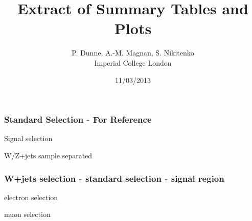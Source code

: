 \documentclass[red,compress,xcolor=table]{beamer}
\title%
{Extract of Summary Tables and Plots}
\subtitle
{} %
\author[A.-M. Magnan] %
{P. Dunne, A.-M. Magnan, S. Nikitenko\\
  Imperial College London}
\date[11/03/2013] %
{11/03/2013}
\begin{document}
\begin{frame}
  \titlepage
\end{frame}

\begin{frame}
  \frametitle{Standard Selection - For Reference}

\begin{center}
\centering Signal selection\\
{\tiny
\hspace*{-1cm}

}
\centering W/Z+jets sample separated\\
  {\tiny
    
  }

\end{center}

\end{frame}

\begin{frame}
  \frametitle{W+jets selection - standard selection - signal region}

\vspace*{-1cm}
\begin{center}
\centering electron selection\\
{\tiny
\hspace*{-1cm}

}
\centering muon selection\\
{\tiny
\hspace*{-1cm}

}
\end{center}


\end{frame}
\end{document}
